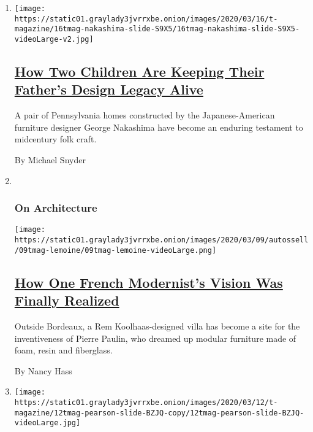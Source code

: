 \begin{enumerate}
\def\labelenumi{\arabic{enumi}.}
\item
  \texttt{[image: https://static01.graylady3jvrrxbe.onion/images/2020/03/16/t-magazine/16tmag-nakashima-slide-S9X5/16tmag-nakashima-slide-S9X5-videoLarge-v2.jpg]}

  \hypertarget{how-two-children-are-keeping-their-fathers-design-legacy-alive}{%
  \subsection{\texorpdfstring{\href{/2020/03/16/t-magazine/george-nakashima-legacy.html}{How
  Two Children Are Keeping Their Father's Design Legacy
  Alive}}{How Two Children Are Keeping Their Father's Design Legacy Alive}}\label{how-two-children-are-keeping-their-fathers-design-legacy-alive}}

  A pair of Pennsylvania homes constructed by the Japanese-American
  furniture designer George Nakashima have become an enduring testament
  to midcentury folk craft.

  By Michael Snyder
\item ~
  \hypertarget{on-architecture}{%
  \subsubsection{On Architecture}\label{on-architecture}}

  \texttt{[image: https://static01.graylady3jvrrxbe.onion/images/2020/03/09/autossell/09tmag-lemoine/09tmag-lemoine-videoLarge.png]}

  \hypertarget{how-one-french-modernists-vision-was-finally-realized}{%
  \subsection{\texorpdfstring{\href{/2020/03/11/t-magazine/rem-koolhaas-pierre-paulin.html}{How
  One French Modernist's Vision Was Finally
  Realized}}{How One French Modernist's Vision Was Finally Realized}}\label{how-one-french-modernists-vision-was-finally-realized}}

  Outside Bordeaux, a Rem Koolhaas-designed villa has become a site for
  the inventiveness of Pierre Paulin, who dreamed up modular furniture
  made of foam, resin and fiberglass.

  By Nancy Hass
\item
  \texttt{[image: https://static01.graylady3jvrrxbe.onion/images/2020/03/12/t-magazine/12tmag-pearson-slide-BZJQ-copy/12tmag-pearson-slide-BZJQ-videoLarge.jpg]}


\end{enumerate}
